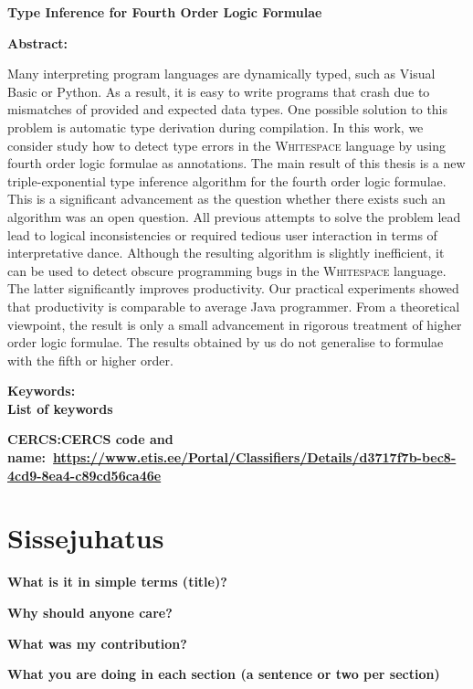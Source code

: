 \documentclass[12pt]{article}
\newcommand\peatykk[1]{
  \clearpage
  \section{#1}}
\newcommand\markus[1]{\textcolor{roheline}{\textbf{#1}}}
\begin{document}
{
\noindent\textbf{\large Type Inference for Fourth Order Logic Formulae}

\vspace*{3ex}

\noindent\textbf{Abstract:}

\noindent
Many interpreting program languages are dynamically typed, such as Visual Basic or Python. As a result, it is easy to write programs that crash due to mismatches of provided and expected data types.  One possible solution to this problem is automatic type derivation during compilation. In this work, we consider study how to detect type errors in the \textsc{Whitespace} language by using fourth order logic formulae as annotations. The main result of this thesis is a new triple-exponential type inference algorithm for the fourth order logic formulae. This is a significant advancement as the question whether there exists such an algorithm was an open question. 
All previous attempts to solve the problem lead lead to logical inconsistencies or required tedious user interaction in terms of interpretative dance. Although the resulting algorithm is slightly inefficient, it can be used to detect obscure programming bugs in the \textsc{Whitespace} language. The latter significantly improves productivity. Our practical experiments showed that productivity is comparable to average Java programmer.   
From a theoretical viewpoint, the result is only a small advancement in rigorous treatment of higher order logic formulae. The results obtained by us do not generalise to formulae with the fifth or higher order. 

\vspace*{1ex}

\noindent \textbf{Keywords:}\\
\markus{List of keywords}

\vspace*{1ex}

\noindent\textbf{CERCS:}\markus{CERCS code and name:~\url{https://www.etis.ee/Portal/Classifiers/Details/d3717f7b-bec8-4cd9-8ea4-c89cd56ca46e}}

\vspace*{1ex}
}
\newpage
  \tableofcontents
  \peatykk{Sissejuhatus}
    \markus{What is it in simple terms (title)?}

    \markus{Why should anyone care?}

    \markus{What was my contribution?}

    \markus{What you are doing in each section (a sentence or two per section)}
\end{document}
